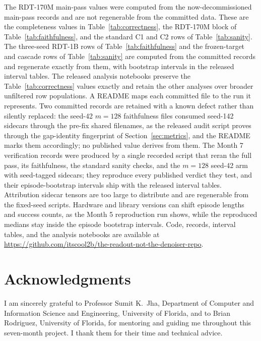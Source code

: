 \documentclass{article}
\begin{document}
The RDT-170M main-pass values were computed from the now-decommissioned main-pass records and are not regenerable from the committed data.
These are the completeness values in Table~\ref{tab:correctness}, the RDT-170M block of Table~\ref{tab:faithfulness}, and the standard C1 and C2 rows of Table~\ref{tab:sanity}.
The three-seed RDT-1B rows of Table~\ref{tab:faithfulness} and the frozen-target and cascade rows of Table~\ref{tab:sanity} are computed from the committed records and regenerate exactly from them, with bootstrap intervals in the released interval tables.
The released analysis notebooks preserve the Table~\ref{tab:correctness} values exactly and retain the other analyses over broader unfiltered row populations.
A README maps each committed file to the run it represents.
Two committed records are retained with a known defect rather than silently replaced: the seed-42 $m{=}128$ faithfulness files consumed seed-142 sidecars through the pre-fix shared filenames, as the released audit script proves through the gap-identity fingerprint of Section~\ref{sec:metrics}, and the README marks them accordingly; no published value derives from them.
The Month 7 verification records were produced by a single recorded script that reran the full pass, its faithfulness, the standard sanity checks, and the $m{=}128$ seed-42 arm with seed-tagged sidecars; they reproduce every published verdict they test, and their episode-bootstrap intervals ship with the released interval tables.
Attribution sidecar tensors are too large to distribute and are regenerable from the fixed-seed scripts.
Hardware and library versions can shift episode lengths and success counts, as the Month 5 reproduction run shows, while the reproduced medians stay inside the episode bootstrap intervals.
Code, records, interval tables, and the analysis notebooks are available at \url{https://github.com/itscool2b/the-readout-not-the-denoiser-repo}.

\section*{Acknowledgments}

I am sincerely grateful to Professor Sumit K.\ Jha, Department of Computer and Information Science and Engineering, University of Florida, and to Brian Rodriguez, University of Florida, for mentoring and guiding me throughout this seven-month project. I thank them for their time and technical advice.



\end{document}
